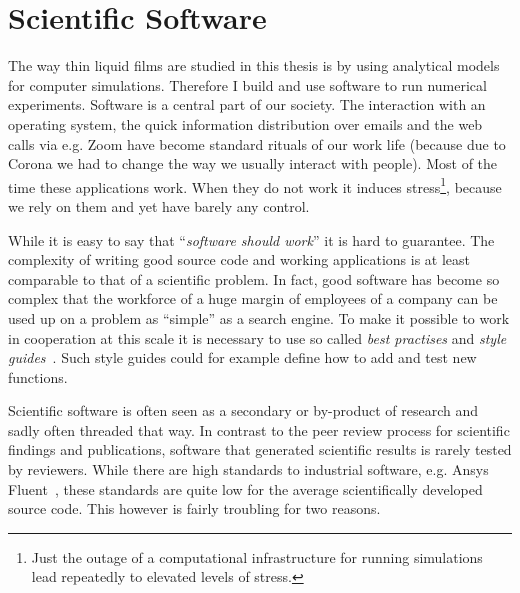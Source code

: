 \section{Scientific Software}
\label{section:statement_software}
The way thin liquid films are studied in this thesis is by using analytical models for computer simulations.
Therefore I build and use software to run numerical experiments.
Software is a central part of our society.
The interaction with an operating system, the quick information distribution over emails and the web calls via e.g. Zoom have become standard rituals of our work life (because due to Corona we had to change the way we usually interact with people).
Most of the time these applications work.
When they do not work it induces stress\footnote{Just the outage of a computational infrastructure for running simulations lead repeatedly to elevated levels of stress.}, because we rely on them and yet have barely any control.

While it is easy to say that ``\textit{software should work}'' it is hard to guarantee.
The complexity of writing good source code and working applications is at least comparable to that of a scientific problem.
In fact, good software has become so complex that the workforce of a huge margin of employees of a company can be used up on a problem as ``simple'' as a search engine.
To make it possible to work in cooperation at this scale it is necessary to use so called \textit{best practises} and \textit{style guides}~\cite{sommervilleSoftwareEngineering2015}.
Such style guides could for example define how to add and test new functions.

Scientific software is often seen as a secondary or by-product of research and sadly often threaded that way.
In contrast to the peer review process for scientific findings and publications, software that generated scientific results is rarely tested by reviewers.  
While there are high standards to industrial software, e.g. Ansys Fluent~\cite{matssonIntroductionANSYSFluent2022}, these standards are quite low for the average scientifically developed source code.
This however is fairly troubling for two reasons.

